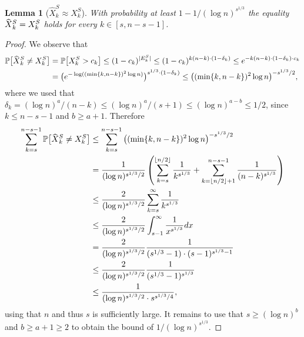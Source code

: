 \documentclass[a4paper,11pt]{article}
\theoremstyle{definition}
\theoremstyle{plain}
\newtheorem{lemma}{Lemma}
\newcommand{\prob}{\mathbb{P}}
\newcommand{\capped}[1]{\hstretch{2}{\hat{\hstretch{.5}{#1}}}}
\DeclarePairedDelimiter{\abs}{\lvert}{\rvert}
\begin{document}
\begin{lemma}[$\hat X^S_k\approx X^S_k$]
  \label{lm:capped_eq_uncapped}
  With probability at least $1 - 1/(\log{n})^{s^{1/3}}$ the equality $\capped{X}^S_k=X^S_k$ holds for every $k\in [s, n-s-1]$.
\end{lemma}
\begin{proof}
  We observe that
  \begin{equation}\label{eq:prob_capped_uncapped}
  \begin{split}
    \prob \big[ \capped{X}^S_k \neq X^S_k \big]
    &= \prob \big[X^S_k > c_k \big]
    \leq (1 - c_k)^{\abs{E_k^S}}
    \leq (1 - c_k)^{k (n-k) \cdot(1-\delta_k)}
    \leq e^{-k (n-k) \cdot(1-\delta_k) \cdot c_{k}}
    \\&= \big(e^{-\log((\min\{ k, n-k\})^2 \log{n})}\big)^{s^{1/3}\cdot(1-\delta_k)}
    \le \big((\min\{ k, n-k\})^2 \log{n}\big)^{-s^{1/3}/2},
  \end{split}
  \end{equation}
  where we used that $\delta_k=(\log n)^a/(n-k)\le (\log n)^a/(s+1)\le (\log n)^{a-b}\le 1/2$, since $k\le n - s - 1$ and $b\ge a + 1$.
  Therefore
  \begin{align*}
      \sum_{k=s}^{n-s-1}
      \prob \big[\capped{X}^S_k \neq X^S_k \big] & \leq
      \sum_{k=s}^{n-s-1} \big((\min\{ k, n-k\})^2 \log{n}\big)^{-s^{1/3}/2}
      \\ &= \frac{1}{(\log{n})^{s^{1/3}/2}} \left( \sum_{k=s}^{\lfloor n/2 \rfloor} \frac{1}{k^{s^{1/3}}} +
      \sum_{k=\lfloor n/2 \rfloor+1}^{n-s-1} \frac{1}{(n- k)^{s^{1/3}}} \right)
      \\ &\leq \frac{2}{(\log{n})^{s^{1/3}/2}} \sum_{k=s}^{\infty}\frac{1}{k^{s^{1/3}}}
      \\ &\leq \frac{2}{(\log{n})^{s^{1/3}/2}} \int_{s-1}^{\infty}\frac{1}{x^{s^{1/3}}}dx
      \\ &= \frac{2}{(\log{n})^{s^{1/3}/2}} \frac{1}{(s^{1/3} - 1)\cdot (s-1)^{s^{1/3}-1}}
      \\ &\le \frac{2}{(\log{n})^{s^{1/3}/2}} \frac{1}{(s^{1/3} - 1)^{s^{1/3}}}
      \\ &\le \frac{1}{(\log{n})^{s^{1/3}/2} \cdot s^{s^{1/3}/4}},
  \end{align*}
  using that $n$ and thus $s$ is sufficiently large. It remains to use that $s\ge (\log n)^b$ and $b\ge a + 1 \ge 2$ to obtain the bound of $1/(\log n)^{s^{1/3}}$.
\end{proof}
\end{document}
